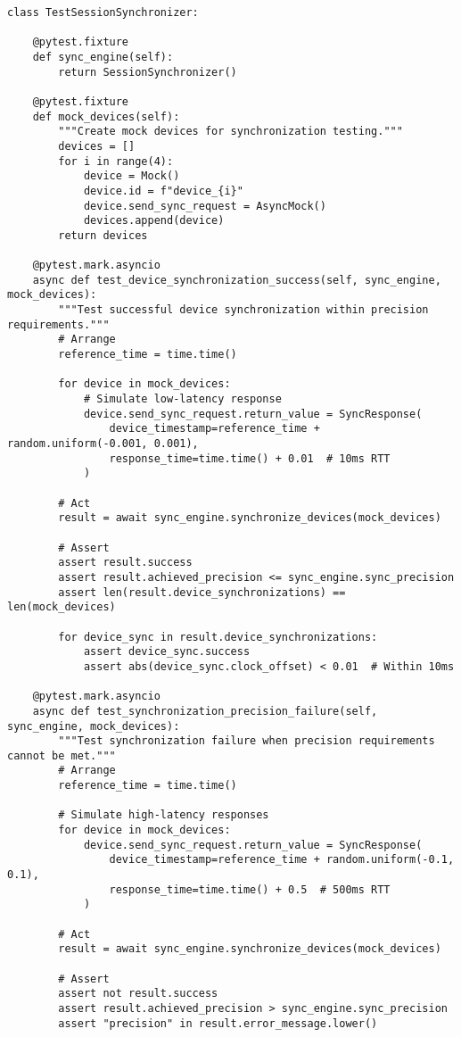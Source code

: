 \documentclass[12pt,a4paper]{report}
\begin{document}
\begin{verbatim}
class TestSessionSynchronizer:

    @pytest.fixture
    def sync_engine(self):
        return SessionSynchronizer()

    @pytest.fixture
    def mock_devices(self):
        """Create mock devices for synchronization testing."""
        devices = []
        for i in range(4):
            device = Mock()
            device.id = f"device_{i}"
            device.send_sync_request = AsyncMock()
            devices.append(device)
        return devices

    @pytest.mark.asyncio
    async def test_device_synchronization_success(self, sync_engine, mock_devices):
        """Test successful device synchronization within precision requirements."""
        # Arrange
        reference_time = time.time()

        for device in mock_devices:
            # Simulate low-latency response
            device.send_sync_request.return_value = SyncResponse(
                device_timestamp=reference_time + random.uniform(-0.001, 0.001),
                response_time=time.time() + 0.01  # 10ms RTT
            )

        # Act
        result = await sync_engine.synchronize_devices(mock_devices)

        # Assert
        assert result.success
        assert result.achieved_precision <= sync_engine.sync_precision
        assert len(result.device_synchronizations) == len(mock_devices)

        for device_sync in result.device_synchronizations:
            assert device_sync.success
            assert abs(device_sync.clock_offset) < 0.01  # Within 10ms

    @pytest.mark.asyncio
    async def test_synchronization_precision_failure(self, sync_engine, mock_devices):
        """Test synchronization failure when precision requirements cannot be met."""
        # Arrange
        reference_time = time.time()

        # Simulate high-latency responses
        for device in mock_devices:
            device.send_sync_request.return_value = SyncResponse(
                device_timestamp=reference_time + random.uniform(-0.1, 0.1),
                response_time=time.time() + 0.5  # 500ms RTT
            )

        # Act
        result = await sync_engine.synchronize_devices(mock_devices)

        # Assert
        assert not result.success
        assert result.achieved_precision > sync_engine.sync_precision
        assert "precision" in result.error_message.lower()


\end{verbatim}
\end{document}
